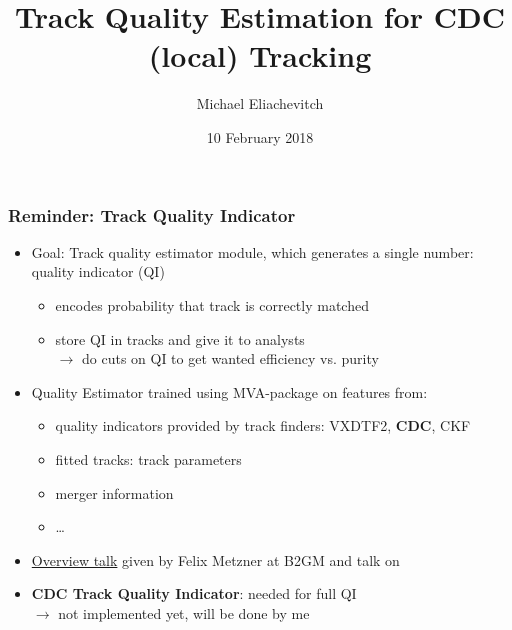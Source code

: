 \documentclass[18pt]{beamer}
\title{Track Quality Estimation for CDC (local) Tracking}
\subtitle{}
\author{Michael Eliachevitch}
\date{10 February 2018}
\institute{ETP - KIT}
\begin{document}


\begin{frame}
  \frametitle{Reminder: Track Quality Indicator}
  \begin{itemize}
  \item Goal: Track quality estimator module, which generates a single number: quality indicator (QI)
    \begin{itemize}
    \item encodes probability that track is correctly matched
    \item store QI in tracks and give it to analysts\\
      $\rightarrow$ do cuts on QI to get wanted efficiency vs. purity
    \end{itemize}
  \item Quality Estimator trained using MVA-package on features from:
    \begin{itemize}
    \item quality indicators provided by track finders: VXDTF2, \textbf{CDC}, CKF
    \item fitted tracks: track parameters
    \item merger information
    \item \dots
    \end{itemize}
  \item  \href{https://kds.kek.jp/indico/event/26522/session/10/contribution/75/material/slides/0.pdf}{Overview talk} given by Felix Metzner at B2GM and talk on 
  \item \textbf{CDC Track Quality Indicator}: needed for full QI\\
    $\rightarrow$ not implemented yet, will be done by me
  \end{itemize}
\end{frame}
\end{document}
